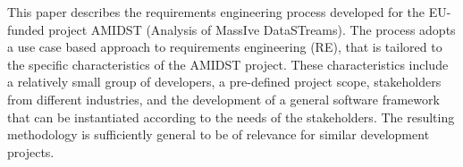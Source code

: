 
This paper describes the requirements engineering process developed for the EU-funded project AMIDST (Analysis of MassIve DataSTreams). The process adopts a use case based approach to requirements engineering (RE), that is tailored to the specific characteristics of the AMIDST project. These characteristics include a relatively small group of developers, a pre-defined project scope, stakeholders from different industries, and the development of a general software framework that can be instantiated according to the needs of the stakeholders. The resulting methodology is sufficiently general to be of relevance for similar development projects.